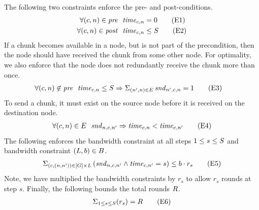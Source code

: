 The following two constraints enforce the pre- and post-conditions.
\begin{align}
    \forall (c,n) \in \mathit{pre} \ \ \mathit{time}_{c,n} &=0
    \tag{E1}\label{eqn:bc-zero} \\
    \forall (c,n) \in \mathit{post} \ \ \mathit{time}_{c,n}&\leq S
    \tag{E2}\label{eqn:bc-insteps}
\end{align}
If a chunk becomes available in a node, but is not part of the
precondition, then the node should have received the chunk from some
other node. For optimality, we also enforce that the node does not
redundantly receive the chunk more than once.
\begin{align}
    \forall (c,n) \not\in \mathit{pre} \ \ \mathit{time}_{c,n}&\leq S \Rightarrow \Sigma_{(n',n)\in E}\,\mathit{snd}_{n',c,n}=1
    \tag{E3}\label{eqn:bc-hassender}
\end{align}
To send a chunk, it must exist on the source node before it is
received on the destination node.
\begin{align}
    \forall (c,n) \in E \ \ \mathit{snd}_{n,c,n'}\Rightarrow\mathit{time}_{c,n}<\mathit{time}_{c,n'}
    \tag{E4}\label{eqn:bc-sendexisting}
\end{align}
The following enforces the bandwidth constraint at all steps $1 \leq s
\leq S$ and bandwidth constraint $(L,b)\in B$.
\begin{align}
    \Sigma_{(c,(n,n'))\in\left[G\right]\times L}\left(\mathit{snd}_{n,c,n'}\wedge\mathit{time}_{c,n'}=s\right)\leq b \cdot r_s
    \tag{E5}\label{eqn:bc-bw}
\end{align}
%
Note, we have multiplied the bandwidth constraints by $r_s$ to allow
$r_s$ rounds at step $s$.
%
Finally, the following bounds the total rounds $R$.
\begin{align}
    \Sigma_{1\leq s\leq S}(r_s)=R
    \tag{E6}\label{eqn:bc-rounds}
\end{align}

